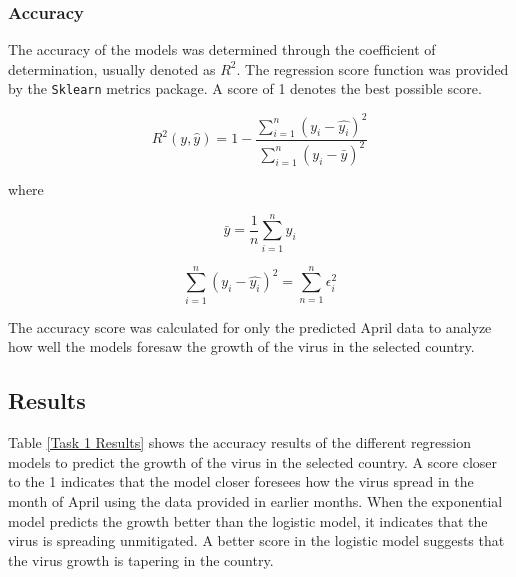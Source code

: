\documentclass{homework}
\begin{document}
\subsubsection{Accuracy}

The accuracy of the models was determined through the coefficient of determination, usually denoted as $R^2$. The regression score function was provided by the \texttt{Sklearn} metrics package. A score of 1 denotes the best possible score.

\begin{equation}
  R^2(y, \hat{y}) = 1-\frac{\sum_{i=1}^n(y_i - \hat{y_i})^2}{\sum_{i=1}^{n}(y_i - \bar{y})^2}
\end{equation}

where

\begin{equation*}
  \bar{y} = \frac{1}{n}\sum_{i=1}^{n} y_i
\end{equation*}

\begin{equation*}
  \sum_{i=1}^n(y_i - \hat{y_i})^2 = \sum_{n=1}^n \epsilon_i^2
\end{equation*}

The accuracy score was calculated for only the predicted April data to analyze how well the models foresaw the growth of the virus in the selected country.

\newpage
\subsection{Results}

Table \ref{Task 1 Results} shows the accuracy results of the different regression models to predict the growth of the virus in the selected country. A score closer to the 1 indicates that the model closer foresees how the virus spread in the month of April using the data provided in earlier months. When the exponential model predicts the growth better than the logistic model, it indicates that the virus is spreading unmitigated. A better score in the logistic model suggests that the virus growth is tapering in the country.
\end{document}
